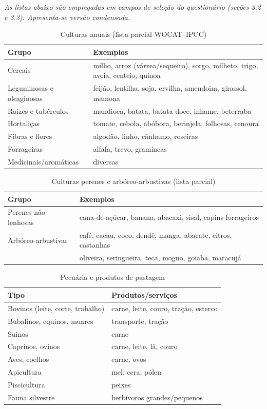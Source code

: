 \textit{As listas abaixo são empregadas em campos de seleção do questionário (seções 3.2 e 3.3). Apresenta-se versão condensada.}

\begin{table}[htbp]
\centering\small
\caption{Culturas anuais (lista parcial WOCAT--IPCC)}
\label{tab:app_annual_crops}
\begin{tabular}{ll}
\toprule
\textbf{Grupo} & \textbf{Exemplos} \\
\midrule
Cereais & milho, arroz (várzea/sequeiro), sorgo, milheto, trigo, aveia, centeio, quinoa \\
Leguminosas e oleaginosas & feijão, lentilha, soja, ervilha, amendoim, girassol, mamona \\
Raízes e tubérculos & mandioca, batata, batata-doce, inhame, beterraba \\
Hortaliças & tomate, cebola, abóbora, berinjela, folhosas, cenoura \\
Fibras e flores & algodão, linho, cânhamo, roseiras \\
Forrageiras & alfafa, trevo, gramíneas \\
Medicinais/aromáticas & diversas \\
\bottomrule
\end{tabular}
\end{table}

\begin{table}[htbp]
\centering\small
\caption{Culturas perenes e arbóreo-arbustivas (lista parcial)}
\label{tab:app_perennial_crops}
\begin{tabular}{ll}
\toprule
\textbf{Grupo} & \textbf{Exemplos} \\
\midrule
Perenes não lenhosas & cana-de-açúcar, banana, abacaxi, sisal, capins forrageiros \\
Arbóreo-arbustivas & café, cacau, coco, dendê, manga, abacate, citros, castanhas \\
& oliveira, seringueira, teca, mogno, goiaba, maracujá \\
\bottomrule
\end{tabular}
\end{table}

\begin{table}[htbp]
\centering\small
\caption{Pecuária e produtos de pastagem}
\label{tab:app_livestock}
\begin{tabular}{ll}
\toprule
\textbf{Tipo} & \textbf{Produtos/serviços} \\
\midrule
Bovinos (leite, corte, trabalho) & carne, leite, couro, tração, esterco \\
Bubalinos, equinos, muares & transporte, tração \\
Suínos & carne \\
Caprinos, ovinos & carne, leite, lã, couro \\
Aves, coelhos & carne, ovos \\
Apicultura & mel, cera, pólen \\
Piscicultura & peixes \\
Fauna silvestre & herbívoros grandes/pequenos \\
\bottomrule
\end{tabular}
\end{table}
